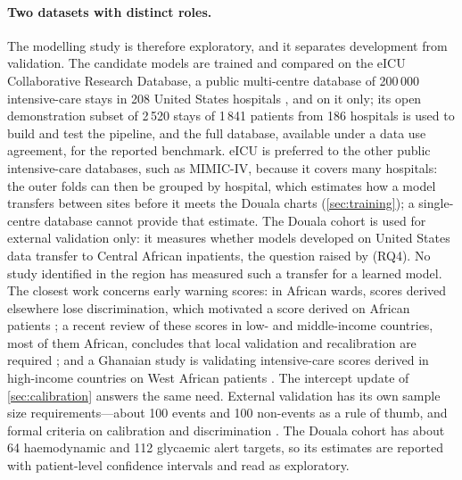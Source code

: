 \paragraph{Two datasets with distinct roles.} The modelling study is therefore exploratory, and it separates development from validation. The candidate models are trained and compared on the eICU Collaborative Research Database, a public multi-centre database of 200\,000 intensive-care stays in 208 United States hospitals \parencite{pollard2018,goldberger2000}, and on it only; its open demonstration subset of 2\,520 stays of 1\,841 patients from 186 hospitals \parencite{eicudemo} is used to build and test the pipeline, and the full database, available under a data use agreement, for the reported benchmark. eICU is preferred to the other public intensive-care databases, such as MIMIC-IV, because it covers many hospitals: the outer folds can then be grouped by hospital, which estimates how a model transfers between sites before it meets the Douala charts (\cref{sec:training}); a single-centre database cannot provide that estimate. The Douala cohort is used for external validation only: it measures whether models developed on United States data transfer to Central African inpatients, the question raised by \textcite{segun2025} (RQ4). No study identified in the region has measured such a transfer for a learned model. The closest work concerns early warning scores: in African wards, scores derived elsewhere lose discrimination, which motivated a score derived on African patients \parencite{moore2017uva}; a recent review of these scores in low- and middle-income countries, most of them African, concludes that local validation and recalibration are required \parencite{tomas2026ews}; and a Ghanaian study is validating intensive-care scores derived in high-income countries on West African patients \parencite{hayfronbenjamin2026}. The intercept update of \cref{sec:calibration} answers the same need. External validation has its own sample size requirements---about 100 events and 100 non-events as a rule of thumb, and formal criteria on calibration and discrimination \parencite{collins2016,riley2021external}. The Douala cohort has about 64 haemodynamic and 112 glycaemic alert targets, so its estimates are reported with patient-level confidence intervals and read as exploratory.

